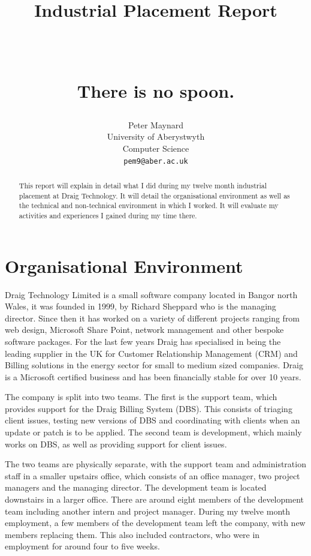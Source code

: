 \documentclass[paper=a4, fontsize=11pt]{scrartcl}	%
\title{ \vspace{-1in} 	\usefont{OT1}{bch}{b}{n}
		\huge \strut Industrial Placement Report \strut \\
		\Large \bfseries \strut There is no spoon. \strut
}
\author{ 									\usefont{OT1}{bch}{m}{n}
        Peter Maynard\\		\usefont{OT1}{bch}{m}{n}
        University of Aberystwyth\\	\usefont{OT1}{bch}{m}{n}
        Computer Science\\
        \texttt{pem9@aber.ac.uk}
}
\date{}
\begin{document}
\maketitle
\begin{abstract}
This report will explain in detail what I did during my twelve month industrial placement at Draig Technology. It will detail the organisational environment as well as the technical and non-technical environment in which I worked. It will evaluate my activities and experiences I gained during my time there.
\end{abstract}

\clearpage
\tableofcontents
\clearpage

\section{Organisational Environment}
Draig Technology Limited\cite{draig} is a small software company located in Bangor north Wales, it was founded in 1999, by Richard Sheppard who is the managing director.  Since then it has worked on a variety of different projects ranging from web design, Microsoft Share Point\cite{sharepoint}, network management and other bespoke software packages. For the last few years Draig has specialised in being the leading supplier in the UK for Customer Relationship Management (CRM) and Billing solutions in the energy sector for small to medium sized companies. Draig is a Microsoft certified business and has been financially stable for over 10 years. 

The company is split into two teams. The first is the support team, which provides support for the Draig Billing System (DBS).  This consists of triaging client issues, testing new versions of DBS and coordinating with clients when an update or patch is to be applied. The second team is development, which mainly works on DBS, as well as providing support for client issues.

The two teams are physically separate, with the support team and administration staff in a smaller upstairs office, which consists of an office manager, two project managers and the managing director. The development team is located downstairs in a larger office. There are around eight members of the development team including another intern and project manager. During my twelve month employment, a few members of the development team left the company, with new members replacing them. This also included contractors, who were in employment for around four to five weeks.
\end{document}

